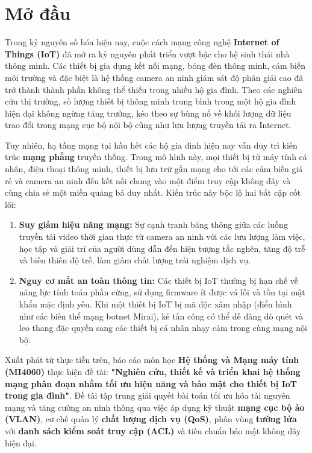\chapter*{Mở đầu}

Trong kỷ nguyên số hóa hiện nay, cuộc cách mạng công nghệ \textbf{Internet of Things (IoT)} đã mở ra kỷ nguyên phát triển vượt bậc cho hệ sinh thái nhà thông minh. Các thiết bị gia dụng kết nối mạng, bóng đèn thông minh, cảm biến môi trường và đặc biệt là hệ thống camera an ninh giám sát độ phân giải cao đã trở thành thành phần không thể thiếu trong nhiều hộ gia đình. Theo các nghiên cứu thị trường, số lượng thiết bị thông minh trung bình trong một hộ gia đình hiện đại không ngừng tăng trưởng, kéo theo sự bùng nổ về khối lượng dữ liệu trao đổi trong mạng cục bộ nội bộ cũng như lưu lượng truyền tải ra Internet.

Tuy nhiên, hạ tầng mạng tại hầu hết các hộ gia đình hiện nay vẫn duy trì kiến trúc \textbf{mạng phẳng} truyền thống. Trong mô hình này, mọi thiết bị từ máy tính cá nhân, điện thoại thông minh, thiết bị lưu trữ gắn mạng cho tới các cảm biến giá rẻ và camera an ninh đều kết nối chung vào một điểm truy cập không dây và cùng chia sẻ một miền quảng bá duy nhất. Kiến trúc này bộc lộ hai bất cập cốt lõi:
\begin{enumerate}
    \item \textbf{Suy giảm hiệu năng mạng:} Sự cạnh tranh băng thông giữa các luồng truyền tải video thời gian thực từ camera an ninh với các lưu lượng làm việc, học tập và giải trí của người dùng dẫn đến hiện tượng tắc nghẽn, tăng độ trễ và biến thiên độ trễ, làm giảm chất lượng trải nghiệm dịch vụ.
    \item \textbf{Nguy cơ mất an toàn thông tin:} Các thiết bị IoT thường bị hạn chế về năng lực tính toán phần cứng, sử dụng firmware ít được vá lỗi và tồn tại mật khẩu mặc định yếu. Khi một thiết bị IoT bị mã độc xâm nhập (điển hình như các biến thể mạng botnet Mirai), kẻ tấn công có thể dễ dàng dò quét và leo thang đặc quyền sang các thiết bị cá nhân nhạy cảm trong cùng mạng nội bộ.
\end{enumerate}

Xuất phát từ thực tiễn trên, báo cáo môn học \textbf{Hệ thống và Mạng máy tính (MI4060)} thực hiện đề tài: \textbf{"Nghiên cứu, thiết kế và triển khai hệ thống mạng phân đoạn nhằm tối ưu hiệu năng và bảo mật cho thiết bị IoT trong gia đình"}. Đề tài tập trung giải quyết bài toán tối ưu hóa tài nguyên mạng và tăng cường an ninh thông qua việc áp dụng kỹ thuật \textbf{mạng cục bộ ảo (VLAN)}, cơ chế quản lý \textbf{chất lượng dịch vụ (QoS)}, phân vùng \textbf{tường lửa} với \textbf{danh sách kiểm soát truy cập (ACL)} và tiêu chuẩn bảo mật không dây hiện đại.


